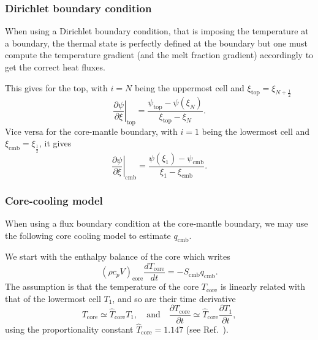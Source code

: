 \documentclass{article}
\begin{document}
\subsubsection{Dirichlet boundary condition}
When using a Dirichlet boundary condition, that is imposing the temperature at a boundary, the thermal state is perfectly defined at the boundary but one must compute the temperature gradient (and the melt fraction gradient) accordingly to get the correct heat fluxes.

This gives for the top, with $i=N$ being the uppermost cell and $\xi_\mathrm{top} = \xi_{N+\frac{1}{2}}$
\begin{equation}
    \left.\frac{\partial \psi}{\partial \xi}\right|_\mathrm{top} =
    \frac{\psi_\mathrm{top}-\psi(\xi_N)}{\xi_\mathrm{top}-\xi_N}.
\end{equation}
Vice versa for the core-mantle boundary, with $i=1$ being the lowermost cell and $\xi_\mathrm{cmb} = \xi_{\frac{1}{2}}$, it gives
\begin{equation}
    \left.\frac{\partial \psi}{\partial \xi}\right|_\mathrm{cmb} =
    \frac{\psi(\xi_1) - \psi_\mathrm{cmb}}{\xi_1 - \xi_\mathrm{cmb}}.
\end{equation}

\subsubsection{Core-cooling model}
When using a flux boundary condition at the core-mantle boundary, we may use the following core cooling model to estimate $q_\mathrm{cmb}$.

We start with the enthalpy balance of the core which writes
\begin{equation}
(\rho c_p V)_\mathrm{core}\frac{d T_\mathrm{core}}{dt} = - S_\mathrm{cmb} q_\mathrm{cmb}.
\label{eq.core-balance}
\end{equation}
The assumption is that the temperature of the core $T_\mathrm{core}$ is linearly related with that of the lowermost cell $T_1$, and so are their time derivative
\begin{equation}
    T_\mathrm{core} \simeq \hat{T}_\mathrm{core}T_1, \quad \mathrm{and}\quad \frac{\partial T_\mathrm{core}}{\partial t} \simeq \hat{T}_\mathrm{core}\frac{\partial T_1}{\partial t},
    \label{eq.core-scaling}
\end{equation}
using the proportionality constant $\hat{T}_\mathrm{core}=1.147$ (see Ref.~\cite{BSW18}).
\end{document}
